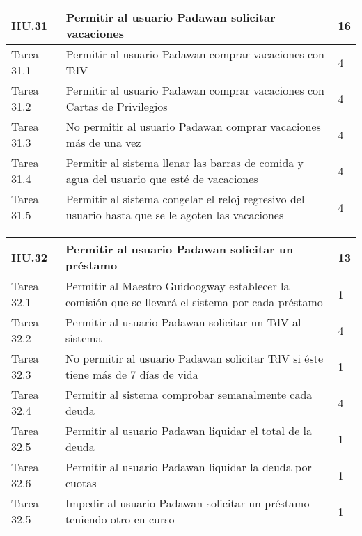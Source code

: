 \newpage

\begin{table}[h]
	\centering
	\begin{tabular}{| p{2.3cm} | p{6.7cm} | p{2cm} |}
		\rowcolor[HTML]{329A9D} 
		{\color[HTML]{FFFFFF} \textbf{HU.31}} & {\color[HTML]{FFFFFF} \textbf{Permitir al usuario Padawan solicitar vacaciones}} & {\color[HTML]{FFFFFF} \textbf{16}}  \\ \hline
		Tarea 31.1 & Permitir al usuario Padawan comprar vacaciones con TdV & 4 \\ \hline
		Tarea 31.2 & Permitir al usuario Padawan comprar vacaciones con Cartas de Privilegios & 4 \\ \hline
		Tarea 31.3 & No permitir al usuario Padawan comprar vacaciones más de una vez & 4 \\ \hline
		Tarea 31.4 & Permitir al sistema llenar las barras de comida y agua del usuario que esté de vacaciones & 4 \\ \hline
		Tarea 31.5 & Permitir al sistema congelar el reloj regresivo del usuario hasta que se le agoten las vacaciones & 4 \\ \hline
	\end{tabular}
\end{table}

\newpage

\begin{table}[h]
	\centering
	\begin{tabular}{| p{2.3cm} | p{6.7cm} | p{2cm} |}
		\rowcolor[HTML]{329A9D} 
		{\color[HTML]{FFFFFF} \textbf{HU.32}} & {\color[HTML]{FFFFFF} \textbf{Permitir al usuario Padawan solicitar un préstamo}} & {\color[HTML]{FFFFFF} \textbf{13}}  \\ \hline
		Tarea 32.1 & Permitir al Maestro Guidoogway establecer la comisión que se llevará el sistema por cada préstamo & 1 \\ \hline
		Tarea 32.2 & Permitir al usuario Padawan solicitar un TdV al sistema & 4 \\ \hline
		Tarea 32.3 & No permitir al usuario Padawan solicitar TdV si éste tiene más de 7 días de vida & 1 \\ \hline
		Tarea 32.4 & Permitir al sistema comprobar semanalmente cada deuda & 4 \\ \hline
		Tarea 32.5 & Permitir al usuario Padawan liquidar el total de la deuda & 1 \\ \hline
		Tarea 32.6 & Permitir al usuario Padawan liquidar la deuda por cuotas & 1 \\ \hline
		Tarea 32.5 & Impedir al usuario Padawan solicitar un préstamo teniendo otro en curso & 1 \\ \hline
	\end{tabular}
\end{table}

